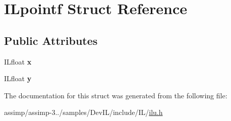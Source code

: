 \hypertarget{struct_i_lpointf}{\section{I\+Lpointf Struct Reference}
\label{struct_i_lpointf}
}
\subsection*{Public Attributes}
\begin{DoxyCompactItemize}
\item 
\hypertarget{struct_i_lpointf_a62747a41be202476c363e455f70ddeb1}{I\+Lfloat {\bfseries x}}\label{struct_i_lpointf_a62747a41be202476c363e455f70ddeb1}

\item 
\hypertarget{struct_i_lpointf_aac46ba52351d952dd3baa994fae3f97d}{I\+Lfloat {\bfseries y}}\label{struct_i_lpointf_aac46ba52351d952dd3baa994fae3f97d}

\end{DoxyCompactItemize}


The documentation for this struct was generated from the following file\+:\begin{DoxyCompactItemize}
\item 
assimp/assimp-\/3../samples/\+Dev\+I\+L/include/\+I\+L/\hyperlink{ilu_8h}{ilu.\+h}\end{DoxyCompactItemize}
